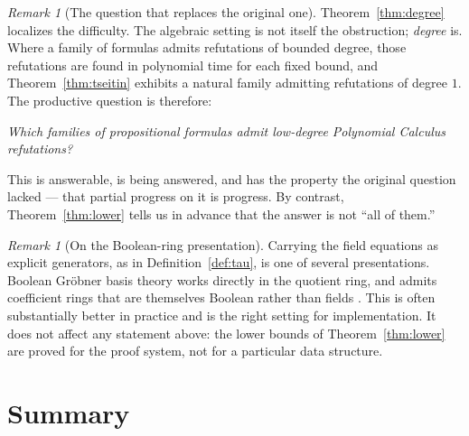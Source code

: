 \documentclass[11pt]{article}
\theoremstyle{plain}
\theoremstyle{definition}
\theoremstyle{remark}
\newtheorem{remark}[theorem]{Remark}
\begin{document}
\begin{remark}[The question that replaces the original one]\label{rem:newq}
Theorem~\ref{thm:degree} localizes the difficulty. The algebraic setting is not
itself the obstruction; \emph{degree} is. Where a family of formulas admits
refutations of bounded degree, those refutations are found in polynomial time
for each fixed bound, and Theorem~\ref{thm:tseitin} exhibits a natural family
admitting refutations of degree $1$. The productive question is therefore:

\begin{center}
\emph{Which families of propositional formulas admit low-degree Polynomial
Calculus refutations?}
\end{center}

\noindent This is answerable, is being answered, and has the property the
original question lacked --- that partial progress on it is progress. By
contrast, Theorem~\ref{thm:lower} tells us in advance that the answer is not
``all of them.''
\end{remark}

\begin{remark}[On the Boolean-ring presentation]
Carrying the field equations as explicit generators, as in
Definition~\ref{def:tau}, is one of several presentations. Boolean Gr\"obner
basis theory works directly in the quotient ring, and admits coefficient rings
that are themselves Boolean rather than fields \cite{sato}. This is often
substantially better in practice and is the right setting for implementation.
It does not affect any statement above: the lower bounds of
Theorem~\ref{thm:lower} are proved for the proof system, not for a particular
data structure.
\end{remark}

\section{Summary}
\end{document}
